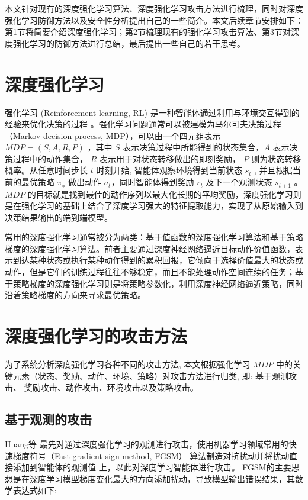 \documentclass[lettersize,journal]{IEEEtran}
\begin{document}
\quad 本文针对现有的深度强化学习算法、深度强化学习攻击方法进行梳理，同时对深度强化学习防御方法以及安全性分析提出自己的一些简介。本文后续章节安排如下：第1节将简要介绍深度强化学习；第2节梳理现有的强化学习攻击算法、第3节对深度强化学习的防御方法进行总结，最后提出一些自己的若干思考。


\section{深度强化学习}

\quad 强化学习 (Reinforcement learning, RL) 是一种智能体通过利用与环境交互得到的经验来优化决策的过程\cite{sutton2018reinforcement} 。强化学习问题通常可以被建模为马尔可夫决策过程（Markov decision process, MDP），可以由一个四元组表示 $MDP = (S, A, R, P)$ ，其中 $S$ 表示决策过程中所能得到的状态集合，$A$ 表示决策过程中的动作集合， $R$ 表示用于对状态转移做出的即刻奖励， $P$ 则为状态转移概率。从任意时间步长 $t$ 时刻开始, 智能体观察环境得到当前状态 $s_t$ , 并且根据当前的最优策略 $\pi_∗$ 做出动作 $a_t$，同时智能体得到奖励 $r_t$ 及下一个观测状态 $s_{t+1}$ 。 $MDP$ 的目标就是找到最佳的动作序列以最大化长期的平均奖励，深度强化学习则是在强化学习的基础上结合了深度学习强大的特征提取能力，实现了从原始输入到决策结果输出的端到端模型。

\quad 常用的深度强化学习通常被分为两类：基于值函数的深度强化学习算法和基于策略梯度的深度强化学习算法。前者主要通过深度神经网络逼近目标动作价值函数，表示到达某种状态或执行某种动作得到的累积回报，它倾向于选择价值最大的状态或动作，但是它们的训练过程往往不够稳定，而且不能处理动作空间连续的任务；基于策略梯度的深度强化学习则是将策略参数化，利用深度神经网络逼近策略，同时沿着策略梯度的方向来寻求最优策略。


\section{深度强化学习的攻击方法}
为了系统分析深度强化学习各种不同的攻击方法, 本文根据强化学习 $MDP$ 中的关键元素（状态、奖励、动作、环境、策略）对攻击方法进行归类, 即: 基于观测攻击、 奖励攻击、动作攻击、环境攻击以及策略攻击。

 \subsection{基于观测的攻击}
 
 \quad Huang等\cite{huang2017adversarial} 最先对通过深度强化学习的观测进行攻击，使用机器学习领域常用的快速梯度符号（Fast gradient sign method, FGSM）\cite{goodfellow2014explaining} 算法制造对抗扰动并将扰动直接添加到智能体的观测值 上，以此对深度学习智能体进行攻击。 FGSM的主要思想是在深度学习模型梯度变化最大的方向添加扰动，导致模型输出错误结果，其数学表达式如下:
\end{document}
